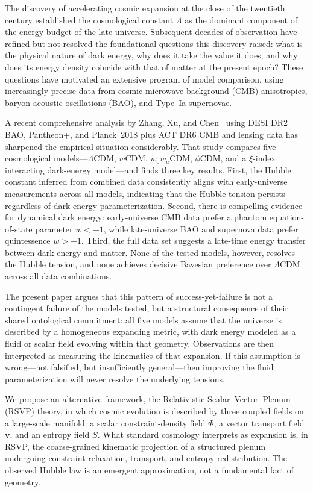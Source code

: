 \documentclass[12pt,a4paper]{article}
\theoremstyle{remark}
\newcommand{\vv}{\mathbf{v}}
\begin{document}
The discovery of accelerating cosmic expansion at the close of the twentieth century established the cosmological constant $\Lambda$ as the dominant component of the energy budget of the late universe. Subsequent decades of observation have refined but not resolved the foundational questions this discovery raised: what is the physical nature of dark energy, why does it take the value it does, and why does its energy density coincide with that of matter at the present epoch? These questions have motivated an extensive program of model comparison, using increasingly precise data from cosmic microwave background (CMB) anisotropies, baryon acoustic oscillations (BAO), and Type~Ia supernovae.

A recent comprehensive analysis by Zhang, Xu, and Chen~\cite{zhang2026} using DESI DR2 BAO, Pantheon+, and Planck~2018 plus ACT DR6 CMB and lensing data has sharpened the empirical situation considerably. That study compares five cosmological models---$\Lambda$CDM, $w$CDM, $w_0 w_a$CDM, $\phi$CDM, and a $\xi$-index interacting dark-energy model---and finds three key results. First, the Hubble constant inferred from combined data consistently aligns with early-universe measurements across all models, indicating that the Hubble tension persists regardless of dark-energy parameterization. Second, there is compelling evidence for dynamical dark energy: early-universe CMB data prefer a phantom equation-of-state parameter $w < -1$, while late-universe BAO and supernova data prefer quintessence $w > -1$. Third, the full data set suggests a late-time energy transfer between dark energy and matter. None of the tested models, however, resolves the Hubble tension, and none achieves decisive Bayesian preference over $\Lambda$CDM across all data combinations.

The present paper argues that this pattern of success-yet-failure is not a contingent failure of the models tested, but a structural consequence of their shared ontological commitment: all five models assume that the universe is described by a homogeneous expanding metric, with dark energy modeled as a fluid or scalar field evolving within that geometry. Observations are then interpreted as measuring the kinematics of that expansion. If this assumption is wrong---not falsified, but insufficiently general---then improving the fluid parameterization will never resolve the underlying tensions.

We propose an alternative framework, the Relativistic Scalar--Vector--Plenum (RSVP) theory, in which cosmic evolution is described by three coupled fields on a large-scale manifold: a scalar constraint-density field $\Phi$, a vector transport field $\vv$, and an entropy field $S$. What standard cosmology interprets as expansion is, in RSVP, the coarse-grained kinematic projection of a structured plenum undergoing constraint relaxation, transport, and entropy redistribution. The observed Hubble law is an emergent approximation, not a fundamental fact of geometry.
\end{document}
